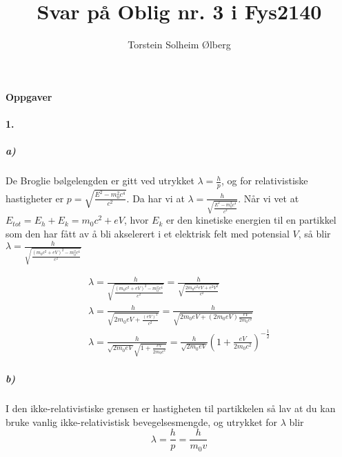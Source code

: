 \documentclass[11pt, A4paper,norsk]{article}
\author{Torstein Solheim Ølberg}
\title{Svar på Oblig nr. 3 i Fys2140}
\begin{document}
\maketitle
	\begin{center}
\Large \textbf{Oppgaver}
	\end{center}









		\paragraph{1.}
			\subparagraph{a)}
				\begin{flushleft}
De Broglie bølgelengden er gitt ved utrykket $\lambda = \frac{h}{p}$, og for relativistiske hastigheter er $p = \sqrt{\frac{E^2 - m_0^2c^4}{c^2}}$. Da har vi at $\lambda = \frac{h}{\sqrt{\frac{E^2 - m_0^2c^4}{c^2}}}$. Når vi vet at $E_{tot} = E_h + E_k = m_0 c^2 + e V$, hvor $E_k$ er den kinetiske energien til en partikkel som den har fått av å bli akselerert i et elektrisk felt med potensial $V$, så blir $\lambda = \frac{h}{\sqrt{\frac{(m_0 c^2 + eV)^2 - m_0^2c^4}{c^2}}}$
				\end{flushleft}
				\begin{gather*}
\lambda = \frac{h}{\sqrt{\frac{(m_0 c^2 + eV)^2 - m_0^2c^4}{c^2}}} = \frac{h}{\sqrt{\frac{2 m_0 c^2 e V + e^2 V^2}{c^2}}} \\
\lambda = \frac{h}{\sqrt{2 m_0 e V + \frac{(eV)^2}{c^2}}} = \frac{h}{\sqrt{2m_0 e V + (2m_0 e V)\frac{e V}{2 m_0 c^2}}} \\
\lambda = \frac{h}{\sqrt{2m_0 e V} \sqrt{ 1 + \frac{e V}{2 m_0 c^2}}} = \frac{h}{\sqrt{2m_0 e V}} \left( 1 + \frac{e V}{2 m_0 c^2} \right)^{- \frac{1}{2}}
				\end{gather*}








			\subparagraph{b)}
				\begin{flushleft}
I den ikke-relativistiske grensen er hastigheten til partikkelen så lav at du kan bruke vanlig ikke-relativistisk bevegelsesmengde, og utrykket for $\lambda$ blir $$\lambda = \frac{h}{p} = \frac{h}{m_0 v}$$
				\end{flushleft}
\end{document}

